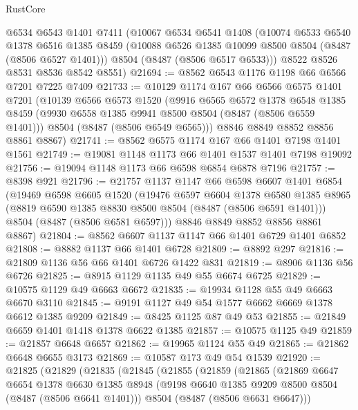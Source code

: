 \begin{lexlean}{RustCore}
\begin{coremodule}
    @6534
    @6543
    @1401
    @7411
    (@10067
      @6534
      @6541
      @1408
      (@10074
        @6533
        @6540
        @1378
        @6516
        @1385
        @8459
        (@10088 @6526 @1385 @10099 @8500 @8504 (@8487 (@8506 @6527 @1401)))
        @8504
        (@8487 (@8506 @6517 @6533)))
      @8522
      @8526
      @8531
      @8536
      @8542
      @8551)
@21694 := @8562 @6543 @1176 @1198 @66 @6566 @7201 @7225 @7409
@21733 := @10129
    @1174
    @167
    @66
    @6566
    @6575
    @1401
    @7201
    (@10139
      @6566
      @6573
      @1520
      (@9916
        @6565
        @6572
        @1378
        @6548
        @1385
        @8459
        (@9930 @6558 @1385 @9941 @8500 @8504 (@8487 (@8506 @6559 @1401)))
        @8504
        (@8487 (@8506 @6549 @6565)))
      @8846
      @8849
      @8852
      @8856
      @8861
      @8867)
@21741 := @8562 @6575 @1174 @167 @66 @1401 @7198 @1401 @1561
@21749 := @19081 @1148 @1173 @66 @1401 @1537 @1401 @7198 @19092
@21756 := @19094 @1148 @1173 @66 @6598 @6854 @6878 @7196
@21757 := @8398 @921
@21796 := @21757
    @1137
    @1147
    @66
    @6598
    @6607
    @1401
    @6854
    (@19469
      @6598
      @6605
      @1520
      (@19476
        @6597
        @6604
        @1378
        @6580
        @1385
        @8965
        (@8819 @6590 @1385 @8830 @8500 @8504 (@8487 (@8506 @6591 @1401)))
        @8504
        (@8487 (@8506 @6581 @6597)))
      @8846
      @8849
      @8852
      @8856
      @8861
      @8867)
@21804 := @8562 @6607 @1137 @1147 @66 @1401 @6729 @1401 @6852
@21808 := @8882 @1137 @66 @1401 @6728
@21809 := @8892 @297
@21816 := @21809 @1136 @56 @66 @1401 @6726 @1422 @831
@21819 := @8906 @1136 @56 @6726
@21825 := @8915 @1129 @1135 @49 @55 @6674 @6725
@21829 := @10575 @1129 @49 @6663 @6672
@21835 := @19934 @1128 @55 @49 @6663 @6670 @3110
@21845 := @9191 @1127 @49 @54 @1577 @6662 @6669 @1378 @6612 @1385 @9209
@21849 := @8425 @1125 @87 @49 @53
@21855 := @21849 @6659 @1401 @1418 @1378 @6622 @1385
@21857 := @10575 @1125 @49
@21859 := @21857 @6648 @6657
@21862 := @19965 @1124 @55 @49
@21865 := @21862 @6648 @6655 @3173
@21869 := @10587 @173 @49 @54 @1539
@21920 := @21825
    (@21829
      (@21835
        (@21845
          (@21855
            (@21859
              (@21865
                (@21869
                  @6647
                  @6654
                  @1378
                  @6630
                  @1385
                  @8948
                  (@9198 @6640 @1385 @9209 @8500 @8504 (@8487 (@8506 @6641 @1401)))
                  @8504
                  (@8487 (@8506 @6631 @6647)))

\end{coremodule}
\end{lexlean}
